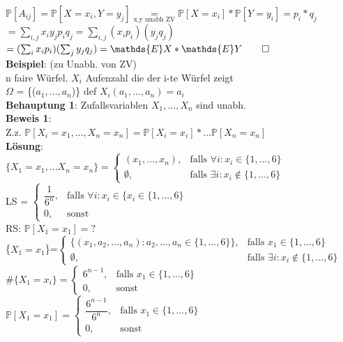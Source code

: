$\mathds{P}[A_{ij}]=\mathds{P}[X=x_i, Y=y_j] \underset{\text{x,y unabh ZV}}{=} \mathds{P}[X=x_i]*\mathds{P}[Y=y_i]=p_i*q_j$\bigskip\\
$=\sum_{i,j}x_iy_jp_iq_j = \sum_{i,j}(x_ip_i)(y_jq_j)$\smallskip\\
$=(\sum_ix_ip_i)(\sum_jy_jq_j) = \mathds{E}X*\mathds{E}Y \qed$\medskip\\
\textbf{Beispiel}: (zu Unabh. von ZV)\\
n faire Würfel. $X_i$ Aufenzahl die der i-te Würfel zeigt\\
 $\Omega$ = \{($a_1,...,a_n$)\} def $X_i(a_1,...,a_n) = a_i$\medskip\\
 \textbf{Behauptung 1}: Zufallsvariablen $X_1,\dots,X_n$ sind unabh.\medskip\\
 \textbf{Beweis 1}:\\
 Z.z. $\mathds{P}[X_i = x_1,...,X_n=x_n] = \mathds{P}[X_i=x_i]*\dots\mathds{P}[X_n=x_n]$\smallskip\\
 \textbf{Lösung}:\\
$\{X_1 = x_1,\dots X_n = x_n\}=
\begin{cases}
(x_1,\dots,x_n), &\text{falls }\forall i:x_i \in \{1,...,6\}\\
\emptyset, & \text{falls } \exists i : x_i \notin \{1,...,6\}
\end{cases}$\smallskip\\
LS = $
\begin{cases}
\dfrac{1}{6^n},&\text{falls } \forall i: x_i \in \{x_i \in \{1,...,6\}\\
0,&\text{sonst}
\end{cases}$\medskip\\
RS: $\mathds{P}[X_1=x_1] = ?$\\
\{$X_1=x_1$\}=$\begin{cases}
\{(x_1,a_2,...,a_n):a_2,...,a_n \in \{1,\dots,6\}\}, &\text{falls }x_1 \in \{1,\dots,6\}\\
\emptyset, & \text{falls } \exists i : x_i \notin \{1,...,6\}
\end{cases}$\medskip\\
$\#\{X_1=x_i\}=\begin{cases}
6^{n-1},&\text{falls }x_1\in \{1,\dots,6\}\\
0,&\text{sonst}
\end{cases}$\medskip\\
$\mathds{P}[X_1=x_1]=\begin{cases}
\dfrac{6^{n-1}}{6^n},&\text{falls }x_1 \in \{1,\dots,6\}\\
0,&\text{sonst}
\end{cases}$\medskip\\
